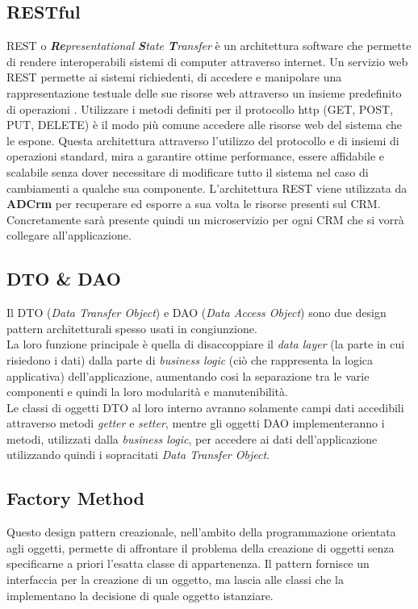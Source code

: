 \documentclass[12pt,a4paper,twoside,openany,english]{book}
\begin{document}
\subsection{RESTful}
REST o \textit{\textbf{Re}presentational \textbf{S}tate \textbf{T}ransfer} è un architettura software che permette di rendere interoperabili sistemi di computer attraverso internet. 
Un servizio web REST permette ai sistemi richiedenti, di accedere e manipolare una rappresentazione testuale delle sue risorse web attraverso un insieme predefinito di operazioni .
Utilizzare i metodi definiti per il protocollo http (GET, POST, PUT, DELETE) è il modo più comune accedere alle risorse web del sistema che le espone.
Questa architettura attraverso l'utilizzo del protocollo  e di insiemi di operazioni standard, mira a garantire ottime performance, essere affidabile e scalabile senza dover necessitare di modificare tutto il sistema nel caso di cambiamenti a qualche sua componente.
L'architettura REST viene utilizzata da \textbf{ADCrm\textbf{}} per recuperare ed esporre a sua volta le risorse presenti sul CRM.
Concretamente sarà presente quindi un microservizio per ogni CRM che si vorrà collegare all'applicazione.

\subsection{DTO \& DAO}
Il DTO (\textit{Data Transfer Object}) e DAO (\textit{Data Access Object}) sono due design pattern architetturali spesso usati in congiunzione.\\
La loro funzione principale è quella di disaccoppiare il \textit{data layer} (la parte in cui risiedono i dati) dalla parte di \textit{business logic} (ciò che rappresenta la logica applicativa) dell'applicazione, aumentando cosi la separazione tra le varie componenti e quindi la loro modularità e manutenibilità.\\
Le classi di oggetti DTO al loro interno avranno solamente campi dati accedibili attraverso metodi \textit{getter} e \textit{setter}, mentre gli oggetti DAO implementeranno i metodi, utilizzati dalla \textit{business logic}, per accedere ai dati dell'applicazione utilizzando quindi i sopracitati \textit{Data Transfer Object}.

\subsection{Factory Method} \label{factory}
Questo design pattern creazionale, nell'ambito della programmazione orientata agli oggetti, permette di affrontare il problema della creazione di oggetti senza specificarne a priori l'esatta classe di appartenenza.
Il pattern fornisce un interfaccia per la creazione di un oggetto, ma lascia alle classi che la implementano la decisione di quale oggetto istanziare.\\
\end{document}
